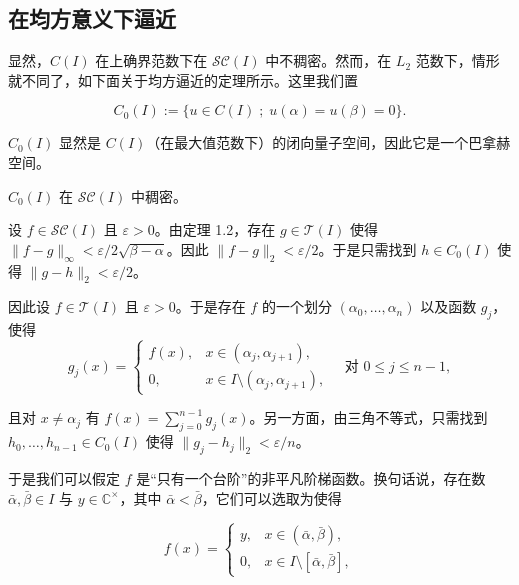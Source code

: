 \subsection*{在均方意义下逼近}

显然，$ C(I) $ 在上确界范数下在 $ \mathcal{SC}(I) $ 中不稠密。然而，在 $ L_{2} $ 范数下，情形就不同了，如下面关于均方逼近的定理所示。这里我们置

\[
C_{0}(I) := \{ u \in C(I) \;;\; u(\alpha) = u(\beta) = 0 \} .
\]

$ C_{0}(I) $ 显然是 $ C(I) $（在最大值范数下）的闭向量子空间，因此它是一个巴拿赫空间。

\begin{proposition}

$ C_{0}(I) $ 在 $ \mathcal{SC}(I) $ 中稠密。

\proofhead
设 $ f \in \mathcal{SC}(I) $ 且 $ \varepsilon > 0 $。由定理 1.2，存在 $ g \in \mathcal{T}(I) $ 使得 $ \|f - g\|_{\infty} < \varepsilon/2\sqrt{\beta - \alpha} $。因此 $ \|f - g\|_{2} < \varepsilon/2 $。于是只需找到 $ h \in C_{0}(I) $ 使得 $ \|g - h\|_{2} < \varepsilon/2 $。

因此设 $ f \in \mathcal{T}(I) $ 且 $ \varepsilon > 0 $。于是存在 $ f $ 的一个划分 $ (\alpha_{0}, \ldots, \alpha_{n}) $ 以及函数 $ g_{j} $，使得
\begin{equation*}
g_{j}(x) = \begin{cases} f(x) , & x \in (\alpha_{j}, \alpha_{j+1}) , \\ 0 , & x \in I \setminus(\alpha_{j}, \alpha_{j+1}) , \end{cases} \quad \text{对 } 0 \le j \le n-1 ,
\end{equation*}

且对 $ x \ne \alpha_{j} $ 有 $ f(x) = \sum_{j=0}^{n-1} g_{j}(x) $。另一方面，由三角不等式，只需找到 $ h_{0}, \ldots, h_{n-1} \in C_{0}(I) $ 使得 $ \|g_{j} - h_{j}\|_{2} < \varepsilon/n $。

于是我们可以假定 $ f $ 是“只有一个台阶”的非平凡阶梯函数。换句话说，存在数 $ \bar{\alpha}, \bar{\beta} \in I $ 与 $ y \in \mathbb{C}^{\times} $，其中 $ \bar{\alpha} < \bar{\beta} $，它们可以选取为使得

\begin{equation*}
f(x) = \begin{cases} y , & x \in (\bar{\alpha}, \bar{\beta}) , \\ 0 , & x \in I \setminus[\bar{\alpha}, \bar{\beta}] , \end{cases}
\end{equation*}


\end{proposition}
